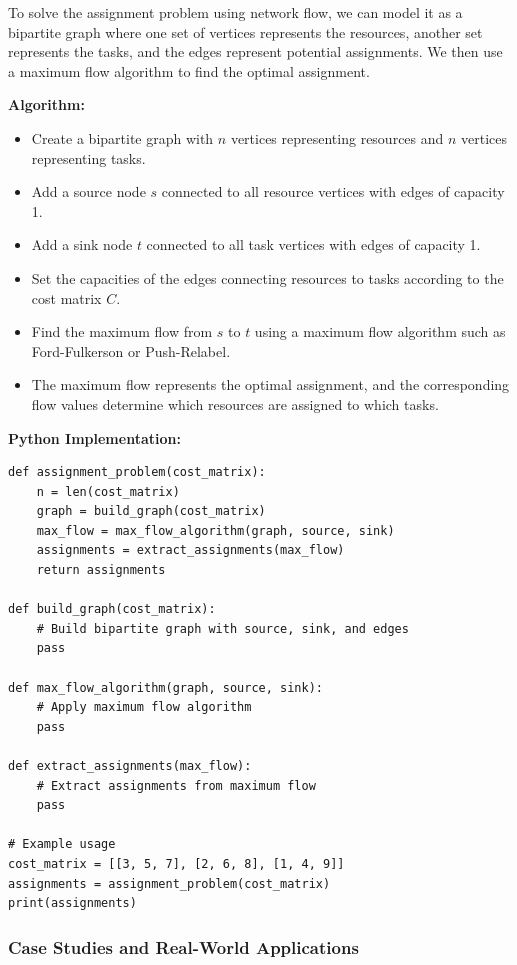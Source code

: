 \documentclass[12pt]{book} %
\begin{document}
To solve the assignment problem using network flow, we can model it as a bipartite graph where one set of vertices represents the resources, another set represents the tasks, and the edges represent potential assignments. We then use a maximum flow algorithm to find the optimal assignment.

\textbf{Algorithm:}
\begin{itemize}
    \item Create a bipartite graph with \(n\) vertices representing resources and \(n\) vertices representing tasks.
\item Add a source node \(s\) connected to all resource vertices with edges of capacity 1.
\item Add a sink node \(t\) connected to all task vertices with edges of capacity 1.
\item Set the capacities of the edges connecting resources to tasks according to the cost matrix \(C\).
\item Find the maximum flow from \(s\) to \(t\) using a maximum flow algorithm such as Ford-Fulkerson or Push-Relabel.
\item The maximum flow represents the optimal assignment, and the corresponding flow values determine which resources are assigned to which tasks.
\end{itemize}

\textbf{Python Implementation:}
\FloatBarrier
\begin{lstlisting}
def assignment_problem(cost_matrix):
    n = len(cost_matrix)
    graph = build_graph(cost_matrix)
    max_flow = max_flow_algorithm(graph, source, sink)
    assignments = extract_assignments(max_flow)
    return assignments

def build_graph(cost_matrix):
    # Build bipartite graph with source, sink, and edges
    pass

def max_flow_algorithm(graph, source, sink):
    # Apply maximum flow algorithm
    pass

def extract_assignments(max_flow):
    # Extract assignments from maximum flow
    pass

# Example usage
cost_matrix = [[3, 5, 7], [2, 6, 8], [1, 4, 9]]
assignments = assignment_problem(cost_matrix)
print(assignments)
\end{lstlisting}

\FloatBarrier
\subsubsection{Case Studies and Real-World Applications}
\end{document}
